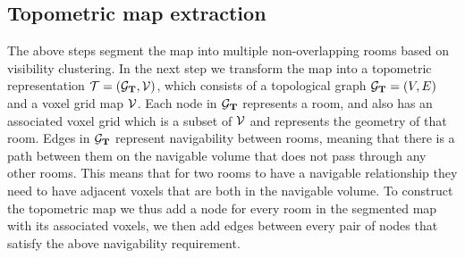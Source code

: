\documentclass{article}
\begin{document}
\subsection{Topometric map extraction}
The above steps segment the map into multiple non-overlapping rooms based on visibility clustering. In the next step we transform the map into a topometric representation \(\mathcal{T} = (\mathcal{G}_{\mathbf{T}}, \mathcal{V})\), which consists of a topological graph \(\mathcal{G}_{\mathbf{T}}=(V,E)\) and a voxel grid map \(\mathcal{V}\). Each node in \(\mathcal{G}_{\mathbf{T}}\) represents a room, and also has an associated voxel grid which is a subset of \(\mathcal{V}\) and represents the geometry of that room. Edges in \(\mathcal{G}_{\mathbf{T}}\) represent navigability between rooms, meaning that there is a path between them on the navigable volume that does not pass through any other rooms. This means that for two rooms to have a navigable relationship they need to have adjacent voxels that are both in the navigable volume. To construct the topometric map we thus add a node for every room in the segmented map with its associated voxels, we then add edges between every pair of nodes that satisfy the above navigability requirement.  
\end{document}
